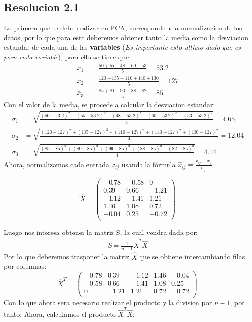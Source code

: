 \documentclass[
  11pt,
  letterpaper,
   addpoints,
   answers
  ]{exam}
\begin{document}
\begin{questions}
\begin{solution}
    \subsection*{Resolucion 2.1}
    Lo primero que se debe realizar en PCA, corresponde a la normalizacion de los datos, por lo que para esto deberemos obtener tanto la media como la desviacion estandar de cada una de las \textbf{variables} (\textit{Es importante esto ultimo dado que es para cada variable}), para ello se tiene que:
    \begin{align}
    \bar{x}_1 & = \frac{50 + 55 + 48 + 60 + 53}{5} = 53.2 \\
    \bar{x}_2 & = \frac{120 + 135 + 110 + 140 + 130}{5} = 127\\
    \bar{x}_3 & = \frac{85 + 80 + 90 + 88 + 82}{5} = 85
    \end{align}
    Con el valor de la media, se procede a calcular la desviacion estandar:
    \begin{align}
    \sigma_1 & = \sqrt{\frac{(50-53.2)^2 + (55-53.2)^2 + (48-53.2)^2 + (60-53.2)^2 + (53-53.2)^2}{4}} = 4.65, \\
    \sigma_2 & = \sqrt{\frac{(120-127)^2 + (135-127)^2 + (110-127)^2 + (140-127)^2 + (130-127)^2}{4}} = 12.04 \\
    \sigma_3 & = \sqrt{\frac{(85-85)^2 + (80-85)^2 + (90-85)^2 + (88-85)^2 + (82-85)^2}{4}} = 4.14
    \end{align} 
    Ahora, normalizamos cada entrada \( x_{ij} \) usando la fórmula \( \hat{x}_{ij} = \frac{x_{ij} - \bar{x}_j}{\sigma_j} \):

\[
\hat{X} = \begin{pmatrix}
-0.78 & -0.58 & 0 \\
0.39 & 0.66 & -1.21 \\
-1.12 & -1.41 & 1.21 \\
1.46 & 1.08 & 0.72 \\
-0.04 & 0.25 & -0.72 \\
\end{pmatrix}
\]

Luego nos interesa obtener la matriz S, la cual vendra dada por:
\begin{align}
S = \frac{1}{n-1} \hat{X}^{T} \hat{X} 
\end{align}
Por lo que deberemos trasponer la matriz \(\hat{X}\) que se obtiene intercambiando filas por columnas:
\[
\hat{X}^T = \begin{pmatrix}
-0.78 & 0.39 & -1.12 & 1.46 & -0.04 \\
-0.58 & 0.66 & -1.41 & 1.08 & 0.25 \\
0 & -1.21 & 1.21 & 0.72 & -0.72 \\
\end{pmatrix}
\]
Con lo que ahora sera necesario realizar el producto y la division por \(n-1\), por tanto:
Ahora, calculamos el producto \( \hat{X}^T \hat{X} \):


\end{solution}
\end{questions}
\end{document}
